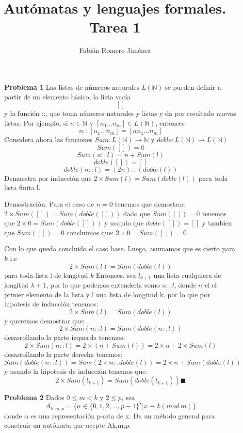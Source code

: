 \documentclass{article}
\title{Autómatas y lenguajes formales. Tarea 1}
\author{Fabián Romero Jiménez}
\date{}
\begin{document}
\maketitle
\begin{enumerate}
\item[\bf{Problema 1}] Las listas de números naturales $L( \mathbb{N} )$ se pueden definir a partir de un elemento básico, la lista vacía
$$ [ ] $$
y la función ::, que toma números naturales y listas y da por resultado nuevas listas. Por ejemplo, si $ n \in \mathbb{N}$ y $[n_{1} . . . n_{m}] \in L(\mathbb{N}) $, entonces $$ n :: [n_{1} . . . n_{m}] = [n n_{1} . . . n_{m}] $$
Considera ahora las funciones $ Sum : L(\mathbb{N}) \rightarrow \mathbb{N} $ y $ doble : L(\mathbb{N}) \rightarrow L(\mathbb{N}) $
$$ Sum([ ]) = 0     $$
$$ Sum(n :: l) = n + Sum(l)   $$
$$ doble([ ]) = [ ] $$
$$ doble(n :: l) = (2  n) :: (doble(l)) $$
Demuestra por inducción que $ 2 \times Sum(l) = Sum(doble(l))$ para toda lista finita l.

\item[Demostración:]
Para el caso de $n = 0$ tenemos que demostrar:
$  2 \times Sum([]) = Sum(doble([]))  $
dado que $ Sum([ ]) = 0  $ tenemos que $  2 \times 0 = Sum(doble([]))  $
y usando que $ doble([ ]) = [ ] $ y tambien que $ Sum([ ]) = 0  $
concluimos que: $  2 \times 0 = Sum([])= 0 $

Con lo que queda concluido el caso base.
Luego, asumamos que es cierto para  $k$
i.e
$$  2 \times Sum(l) = Sum(doble(l)) $$ para toda lista l de longitud $k$
Entonces, sea $l_{k+1}$ una lista cualquiera de longitud $k+1$, por lo que podemos entenderla como $n::l$, donde $n$ el el primer elemento de la lista y l una lista de longitud k, por lo que por hipotesis de inducción tenemos:
$$  2 \times Sum(l) = Sum(doble(l))  $$
y queremos demostrar que:
$$  2 \times Sum(n::l) = Sum(doble(n::l))  $$
desarrollando la parte izquerda tenemos:
$$ 2 \times Sum(n::l) = 2 \times (n + Sum(l))=2 \times n + 2 \times Sum(l) $$
desarrollando la parte derecha tenemos:
$$ Sum(doble(n::l)) = Sum(2 \times n :: doble(l)) = 2 \times n + Sum (doble(l)) $$
y usando la hipotesis de inducción tenemos que:
$$ 2 \times Sum(l_{k+1}) = Sum(doble(l_{k+1}))   \blacksquare$$

\item[\bf{Problema 2}] Dados $0 \le m < k$ y $2 \le p$, sea
$$A_{k,m,p} = \{\alpha \in \{0,1,2,...,p-1\}^\star | x \equiv k (mod\ m) \}$$ donde $\alpha$ es una representación p-aria de x.
Da un método general para construir un autómata que acepte Ak,m,p.


\end{enumerate}
\end{document}

